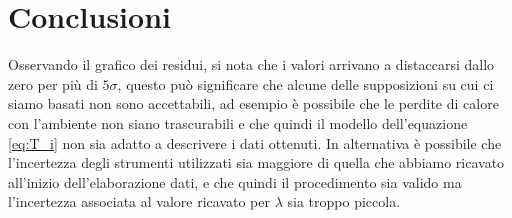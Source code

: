 \documentclass{article}
\begin{document}
    \section{Conclusioni}
    Osservando il grafico dei residui, si nota che i valori arrivano a distaccarsi dallo
    zero per più di $5\sigma$, questo può significare che alcune delle supposizioni su
    cui ci siamo basati non sono accettabili, ad esempio è possibile che le perdite di
    calore con l'ambiente non siano trascurabili e che quindi il modello dell'equazione
    \ref{eq:T_i} non sia adatto a descrivere i dati ottenuti.
    In alternativa è possibile che l'incertezza degli strumenti utilizzati sia maggiore
    di quella che abbiamo ricavato all'inizio dell'elaborazione dati, e che quindi
    il procedimento sia valido ma l'incertezza associata al valore ricavato per $\lambda$
    sia troppo piccola.
\end{document}
